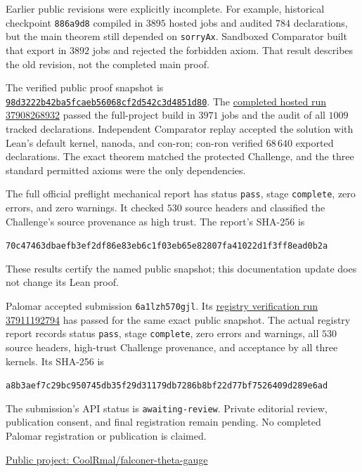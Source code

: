 \documentclass[11pt]{article}
\begin{document}
Earlier public revisions were explicitly incomplete. For example, historical
checkpoint \texttt{886a9d8} compiled in $3895$ hosted jobs and audited $784$
declarations, but the main theorem still depended on \texttt{sorryAx}.
Sandboxed Comparator built that export in $3892$ jobs and rejected the
forbidden axiom. That result describes the old revision, not the completed
main proof.

The verified public proof snapshot is
\href{https://github.com/CoolRmal/falconer-theta-gauge/tree/98d3222b42ba5fcaeb56068cf2d542c3d4851d80}{\texttt{98d3222b42ba5fcaeb56068cf2d542c3d4851d80}}.
The \href{https://github.com/CoolRmal/falconer-theta-gauge/actions/runs/37908268932}{completed hosted run 37908268932}
passed the full-project build in $3971$ jobs and the audit of all $1009$ tracked
declarations. Independent Comparator replay accepted the solution with Lean's
default kernel, nanoda, and con-ron; con-ron verified $68\,640$ exported
declarations. The exact theorem matched the protected Challenge, and the
three standard permitted axioms were the only dependencies.

The full official preflight mechanical report has status \texttt{pass}, stage
\texttt{complete}, zero errors, and zero warnings. It checked $530$ source
headers and classified the Challenge's source provenance as high trust. The
report's SHA-256 is
\begin{center}\small\texttt{70c47463dbaefb3ef2df86e83eb6c1f03eb65e82807fa41022d1f3ff8ead0b2a}\end{center}
These results certify the named public snapshot; this documentation update
does not change its Lean proof.

Palomar accepted submission \texttt{6a1lzh570gjl}. Its
\href{https://github.com/PalomarRegistry/PalomarSubmission/actions/runs/37911192794}{registry verification run 37911192794}
has passed for the same exact public snapshot. The actual registry report
records status \texttt{pass}, stage \texttt{complete}, zero errors and warnings,
all $530$ source headers, high-trust Challenge provenance, and acceptance by
all three kernels. Its SHA-256 is
\begin{center}\small\texttt{a8b3aef7c29bc950745db35f29d31179db7286b8bf22d77bf7526409d289e6ad}\end{center}

The submission's API status is \texttt{awaiting-review}. Private editorial
review, publication consent, and final registration remain pending.
No completed Palomar registration or publication is claimed.

\smallskip
\href{https://github.com/CoolRmal/falconer-theta-gauge}{Public project: CoolRmal/falconer-theta-gauge}
\end{document}
